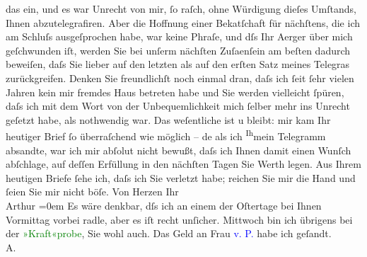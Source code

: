                das ein, und es war Unrecht {\pb}von mir, ſo raſch, ohne
               Würdigung dieſes Umſtands, Ihnen abzutelegrafiren. Aber die Hoffnung einer Beka{\geminationn}tſchaft für nächſtens, die ich am Schluſs ausgeſprochen
               habe, war keine Phraſe, und dſs Ihr Aerger über mich geſchwunden iſt, werden Sie bei
               unſerm nächſten {\pb}Zuſa{\geminationm}enſein
                  \introOben{}am beſten\introOben{} dadurch beweiſen, daſs Sie lieber auf den
               letzten als auf den erſten Satz meines Telegra{\geminationm}s
               zurückgreifen. Denken Sie freundlichſt noch einmal dran, daſs ich ſeit ſehr vielen
               Jahren kein mir fremdes Haus betreten habe und Sie {\pb}werden vielleicht ſpüren, daſs ich mit dem Wort von der Unbequemlichkeit mich
               ſelber mehr ins Unrecht geſetzt habe, als nothwendig war. Das weſentliche ist u
               bleibt: mir kam Ihr \introOben{}heutiger\introOben{} Brief ſo überraſchend wie
               möglich – \introOben{}de{\geminationn}\introOben{} als ich \substVorne{}\textsuperscript{Ih}\substDazwischen{}mein\substHinten{} Telegramm absandte, {\pb}war ich mir abſolut nicht
               bewußt, daſs ich Ihnen damit einen Wunſch abſchlage, auf deſſen Erfüllung in den
               nächſten Tagen Sie Werth legen. Aus Ihrem heutigen Briefe ſehe ich, daſs ich Sie
               verletzt habe; reichen Sie mir die Hand und ſeien Sie mir nicht böſe.\pend
           \pstart
           Von Herzen Ihr{\\[\baselineskip]}\spacefill\mbox{Arthur}\pend
           \leftskip=0em{}\pstart
           \noindent{}{\pb}Es wäre denkbar, dſs ich an einem der
                     Oſtertage bei Ihnen Vormittag vorbei radle, aber es iſt recht
                  unſicher.\pend
           \pstart
           Mittwoch bin ich übrigens bei der \textcolor{green}{»Kraft«probe}{}\ledrightnote{\textcolor{green}{Über unsere Kraft}}, Sie wohl auch.\pend
           \pstart
           Das Geld an Frau \textcolor{blue}{v. P.}{}\ledrightnote{\textcolor{blue}{Malvine von Pollanetz}} habe ich geſandt.{\\}\spacefill\mbox{A.}\pend
           \endnumbering{}  
      